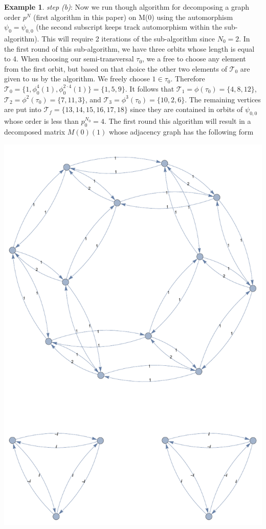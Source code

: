 \documentclass[preprint,12pt]{elsarticle}
\newcommand{\cT}{\mathcal{T}}
\theoremstyle{definition}
\newtheorem{example}[thm]{Example}
\theoremstyle{remark}
\renewcommand{\emph}{\textit}
\begin{document}
\begin{example}
\emph{step (b)}: Now we run though algorithm for decomposing a graph order $p^N$ (first algorithm in this paper) on M(0) using the automorphism $\psi_0=\psi_{0,0}$ (the second subscript keeps track automorphism within the sub-algorithm). This will require 2 iterations of the sub-algorithm since $N_0=2$.  In the first round of this sub-algorithm, we have three orbits whose length is equal to 4.  When choosing our semi-transversal $\tau_0$, we a free to choose any element from the first orbit, but based on that choice the other two elements of $\cT_0$ are given to us by the algorithm.  We freely choose $1\in \tau_0$.  Therefore $\cT_0=\{1,\phi_0^4(1),\phi_0^{2\cdot 4}(1)\}=\{1,5,9\}$. It follows that $\cT_1=\phi(\tau_0)=\{4,8,12\}$, $\cT_2=\phi^2(\tau_0)=\{7,11,3\}$, and $\cT_3=\phi^3(\tau_0)=\{10,2,6\}$. The remaining vertices are put into $\cT_f=\{13,14,15,16,17,18\}$ since they are contained in orbits of $\psi_{0,0}$ whose order is less than $p_0^{N_0}=4$.  The first round this algorithm will result in a decomposed matrix $M(0)(1)$ whose adjacency graph has the following form
\begin{center}
\includegraphics[scale=.5]{ex2_1.pdf}

\end{center}
\end{example}
\end{document}
